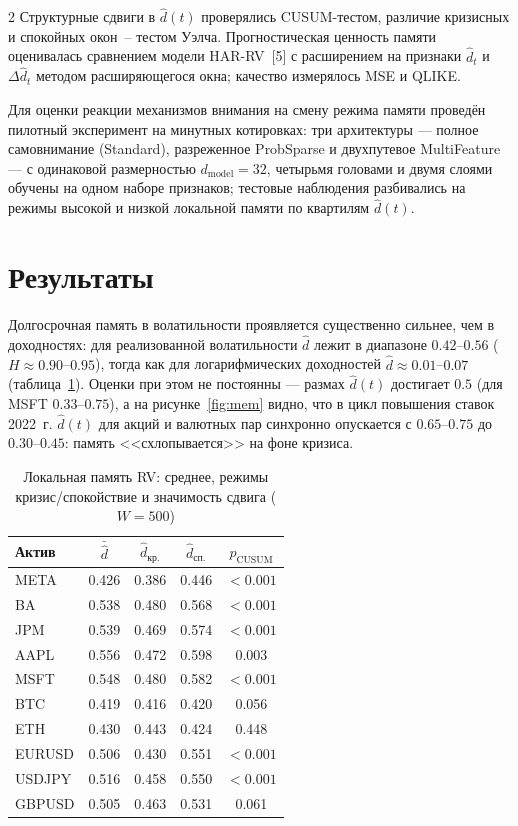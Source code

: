\documentclass[a4paper,10pt,twoside]{article}
\begin{document}
\begin{multicols}{2}
Структурные сдвиги в $\hat d(t)$ проверялись CUSUM-тестом, различие кризисных и спокойных окон~-- тестом Уэлча. Прогностическая ценность памяти оценивалась сравнением модели HAR-RV~[5] с расширением на признаки $\hat d_t$ и $\Delta \hat d_t$ методом расширяющегося окна; качество измерялось MSE и QLIKE.

Для оценки реакции механизмов внимания на смену режима памяти проведён пилотный эксперимент на минутных котировках: три архитектуры --- полное самовнимание (Standard), разреженное ProbSparse и двухпутевое MultiFeature --- с одинаковой размерностью $d_{\text{model}}=32$, четырьмя головами и двумя слоями обучены на одном наборе признаков; тестовые наблюдения разбивались на режимы высокой и низкой локальной памяти по квартилям $\hat d(t)$.

\section{Результаты}

Долгосрочная память в волатильности проявляется существенно сильнее, чем в доходностях: для реализованной волатильности $\hat d$ лежит в диапазоне $0.42$--$0.56$ ($H\approx0.90$--$0.95$), тогда как для логарифмических доходностей $\hat d\approx0.01$--$0.07$ (таблица~\ref{tab:mem}). Оценки при этом не постоянны --- размах $\hat d(t)$ достигает $0.5$ (для MSFT $0.33$--$0.75$), а на рисунке~\ref{fig:mem} видно, что в цикл повышения ставок 2022~г. $\hat d(t)$ для акций и валютных пар синхронно опускается с $0.65$--$0.75$ до $0.30$--$0.45$: память <<схлопывается>> на фоне кризиса.

\begin{table}[H]
\centering\small
\caption{Локальная память RV: среднее, режимы кризис/спокойствие и значимость сдвига ($W=500$)}
\label{tab:mem}
\begin{tabularx}{\columnwidth}{|X|c|c|c|c|}
\hline
Актив & $\bar{\hat d}$ & $\hat d_{\text{кр.}}$ & $\hat d_{\text{сп.}}$ & $p_{\text{CUSUM}}$ \\
\hline
META   & 0.426 & 0.386 & 0.446 & $<0.001$ \\
BA     & 0.538 & 0.480 & 0.568 & $<0.001$ \\
JPM    & 0.539 & 0.469 & 0.574 & $<0.001$ \\
AAPL   & 0.556 & 0.472 & 0.598 & 0.003 \\
MSFT   & 0.548 & 0.480 & 0.582 & $<0.001$ \\
BTC    & 0.419 & 0.416 & 0.420 & 0.056 \\
ETH    & 0.430 & 0.443 & 0.424 & 0.448 \\
EURUSD & 0.506 & 0.430 & 0.551 & $<0.001$ \\
USDJPY & 0.516 & 0.458 & 0.550 & $<0.001$ \\
GBPUSD & 0.505 & 0.463 & 0.531 & 0.061 \\
\hline
\end{tabularx}
\end{table}


\end{multicols}
\end{document}
